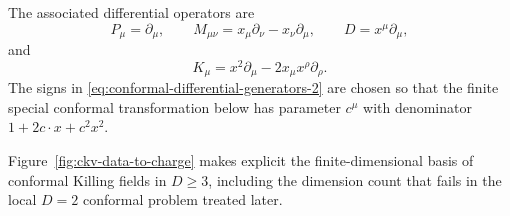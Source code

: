 \begin{definition}
\label{def:differential-conformal-generators}
The associated differential operators are
\begin{equation}
  P_\mu=\partial_\mu,\qquad
  M_{\mu\nu}=x_\mu\partial_\nu-x_\nu\partial_\mu,
  \qquad
  D=x^\mu\partial_\mu,
  \label{eq:conformal-differential-generators-1}
\end{equation}
and
\begin{equation}
  K_\mu=x^2\partial_\mu-2x_\mu x^\rho\partial_\rho .
  \label{eq:conformal-differential-generators-2}
\end{equation}
The signs in \eqref{eq:conformal-differential-generators-2} are chosen so
that the finite special conformal transformation below has parameter \(c^\mu\)
with denominator \(1+2c\cdot x+c^2x^2\).
\end{definition}

Figure~\ref{fig:ckv-data-to-charge} makes explicit the finite-dimensional
basis of conformal Killing fields in \(D\ge3\), including the dimension count
that fails in the local \(D=2\) conformal problem treated later.

